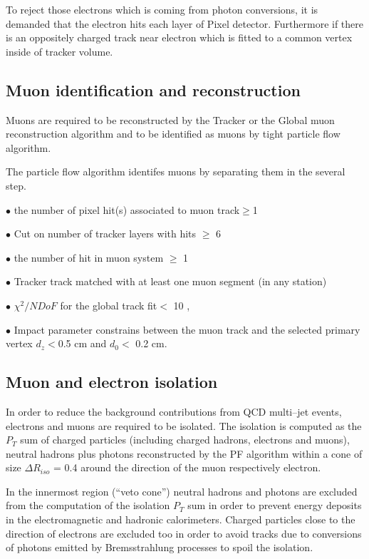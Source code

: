To reject those electrons which is coming from photon conversions, it is demanded that the electron hits each layer of Pixel detector. Furthermore if there is an oppositely charged track near electron which is fitted to a common vertex inside of tracker volume. 


\subsection{Muon identification and reconstruction}


Muons are required to be reconstructed by the Tracker or the Global muon reconstruction algorithm and to be identified as 
muons by tight particle flow algorithm.

The particle flow algorithm identifes  muons by separating them in the several step.


$\bullet$  the number of pixel hit(s) associated to muon track$\geq $1

$\bullet$  Cut on number of tracker layers with hits $\geq $ 6

$\bullet$ the number of hit in muon system $\geq $ 1

$\bullet$ Tracker track matched with at least one muon segment (in any station)

$\bullet$ $\chi ^{2}/NDoF $ for the global track fit$< $ 10 ,

$\bullet$ Impact parameter constrains between the muon track and the selected primary vertex 
 $d_{z} < $0.5 cm and $d_{0} <$ 0.2 cm.

\subsection{Muon and electron isolation}

In order to reduce the background contributions from QCD multi–jet events, electrons and
muons are required to be isolated. The isolation is computed as the $P_{T}$ sum of charged particles (including charged hadrons, 
electrons and muons), neutral hadrons plus photons reconstructed by the PF algorithm within a cone of size
$\Delta R_{iso}$ = 0.4 around the direction of the muon respectively electron. 


In the innermost region
(``veto cone'') neutral
hadrons and photons  are excluded from the computation of the isolation $P_{T}$ sum in order to prevent energy deposits in the electromagnetic and hadronic
calorimeters. Charged particles close to the direction of electrons  are excluded too in order to avoid tracks due to conversions of photons emitted by Bremsstrahlung processes to spoil the isolation.

